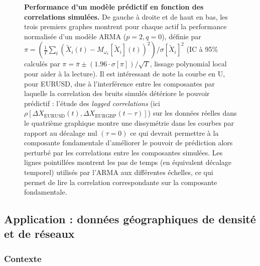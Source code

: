 \begin{figure}
\caption{\small \textbf{Performance d'un modèle prédictif en fonction des correlations simulées.} De gauche à droite et de haut en bas, les trois premiers graphes montrent pour chaque actif la performance normalisée d'un modèle ARMA ($p=2,q=0$), définie par $\pi = \left(\frac{1}{T}\sum_t\left(\tilde{X}_i(t) - M_{\omega_1}\left[\tilde{X}_i\right](t)\right)^2 \right) / \sigma \left[ \tilde{X}_i \right]^2$ (IC à 95\% calculés par $\pi = \bar{\pi} \pm (1.96\cdot \sigma [\pi])/\sqrt{T}$, lissage polynomial local pour aider à la lecture). Il est intéressant de note la courbe en U, pour EURUSD, due à l'interférence entre les composantes par laquelle la correlation des bruits simulés détériore le pouvoir prédictif : l'étude des \emph{lagged correlations} (ici $\rho [\Delta X_{\textrm{EURUSD}}(t),\Delta X_{\textrm{EURGBP}}(t-\tau)]$) sur les données réelles dans le quatrième graphique montre une dissymétrie dans les courbes par rapport au décalage nul $(\tau = 0)$ ce qui devrait permettre à la composante fondamentale d'améliorer le pouvoir de prédiction alors perturbé par les correlations entre les composantes simulées. Les lignes pointillées montrent les pas de temps (en équivalent décalage temporel) utilisés par l'ARMA aux différentes échelles, ce qui permet de lire la correlation correspondante sur la composante fondamentale.}
\label{fig:model_perf}
\end{figure}





\subsection{Application : données géographiques de densité et de réseaux}


\subsubsection{Contexte}


